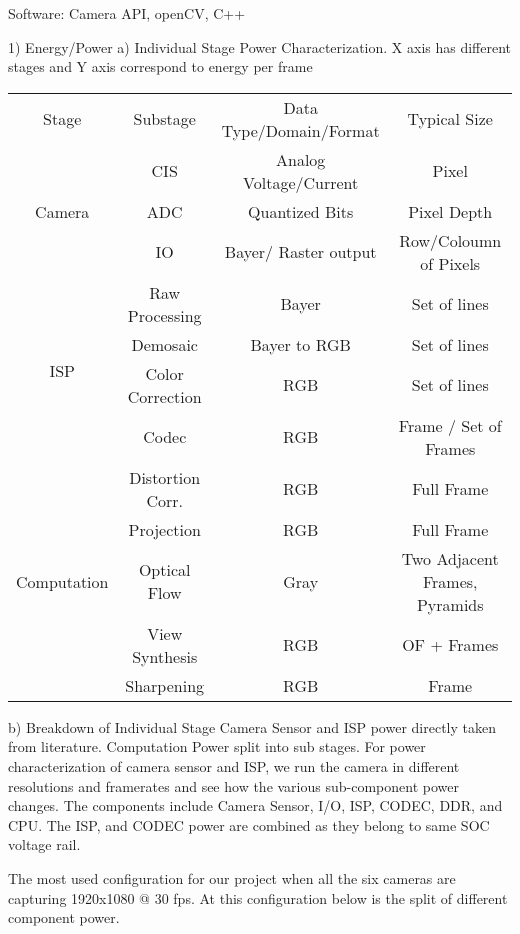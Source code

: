 Software:
Camera API,
openCV, C++
\newline

1) Energy/Power \newline
	a) Individual Stage Power Characterization. 
	X axis has different stages and Y axis correspond to energy per frame \newline
	\begin{tabular}{c|c|c|c}
		Stage & Substage & Data Type/Domain/Format & Typical Size \\
		\multirow{3}{*}{ Camera } & CIS & Analog Voltage/Current & Pixel \\
		& ADC & Quantized Bits & Pixel Depth \\
		& IO & Bayer/ Raster output & Row/Coloumn of Pixels \\
		\multirow{4}{*}{ ISP } & Raw Processing & Bayer & Set of lines \\
		& Demosaic & Bayer to RGB & Set of lines \\
		& Color Correction & RGB & Set of lines \\
		& Codec & RGB & Frame / Set of Frames \\
		\multirow{5}{*}{ Computation } & Distortion Corr. & RGB & Full Frame \\
		& Projection & RGB & Full Frame \\
		& Optical Flow & Gray & Two Adjacent Frames, Pyramids \\
		& View Synthesis & RGB & OF + Frames \\
		& Sharpening & RGB & Frame \\
	\end{tabular} 
\newline

	b) Breakdown of Individual Stage
		Camera Sensor and ISP power directly taken from literature.
		Computation Power split into sub stages. \newline
		For power characterization of camera sensor and ISP, we run the camera in different resolutions and framerates and see how the various sub-component power changes. The components include Camera Sensor, I/O, ISP, CODEC, DDR, and CPU. The ISP, and CODEC power are combined as they belong to same SOC voltage rail.
		
		The most used configuration for our project when all the six cameras are capturing 1920x1080 @ 30 fps. At this configuration below is the split of different component power. \newline
		
